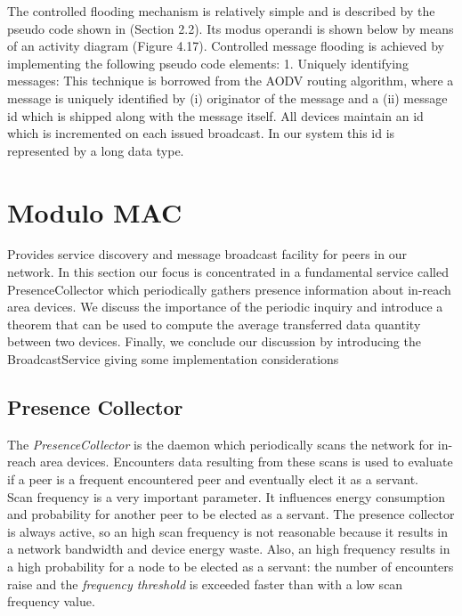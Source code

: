 The controlled flooding mechanism is relatively simple and is described by the pseudo
code shown in (Section 2.2). Its modus operandi is shown below by means of an activity
diagram (Figure 4.17). Controlled message flooding is achieved by implementing the
following pseudo code elements:
1. Uniquely identifying messages: This technique is borrowed from the AODV routing
algorithm, where a message is uniquely identified by (i) originator of the message
and a (ii) message id which is shipped along with the message itself. All devices
maintain an id which is incremented on each issued broadcast. In our system this id
is represented by a long data type.



\section{Modulo MAC}
Provides service discovery and message broadcast facility for peers in our network. In this section our focus is concentrated in a fundamental service called PresenceCollector which periodically gathers presence information about in-reach area devices. We discuss the importance of the periodic inquiry and introduce a theorem that can be used to compute the average transferred data quantity between two devices. Finally, we conclude our discussion by introducing the BroadcastService giving some implementation considerations

\subsection{Presence Collector} 
\label{descrPresenceCollector}
The \textit{PresenceCollector} is the daemon which periodically scans the network for in-reach area devices. Encounters data resulting from these scans is used to evaluate if a peer is a frequent encountered peer and eventually elect it as a servant.
\\

Scan frequency is a very important parameter. It influences energy consumption and probability for another peer to be elected as a servant. The presence collector is always active, so an high scan frequency is not reasonable because it results in a network bandwidth and device energy waste. Also, an high frequency results in a high probability for a node to be elected as a servant: the number of encounters raise and the \textit{frequency threshold} is exceeded faster than with a low scan frequency value.
\\

